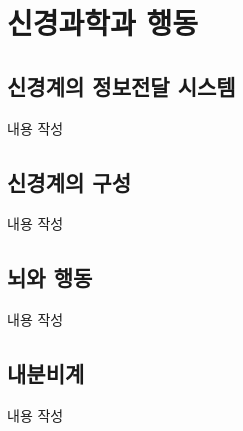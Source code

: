 \section{신경과학과 행동}

\subsection{신경계의 정보전달 시스템}
내용 작성

\subsection{신경계의 구성}
내용 작성

\subsection{뇌와 행동}
내용 작성

\subsection{내분비계}
내용 작성
